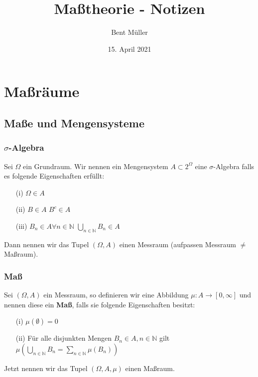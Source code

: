 \documentclass[a4paper]{article}
\newcommand{\N}{\mathbb{N}}
\theoremstyle{definition}
\begin{document}
\title{ \textbf{Maßtheorie - Notizen} }
\author{Bent Müller}
\date{15. April 2021}
\maketitle
\tableofcontents
\pagebreak

\section{Maßräume}

\subsection{Maße und Mengensysteme}

\begin{theorem} %
	\subsubsection{$\sigma$-Algebra}

	Sei $\Omega$ ein Grundraum.
	Wir nennen ein Mengensystem $A \subset 2^{\Omega}$ eine $\sigma$-Algebra 
	falls es folgende Eigenschaften erfüllt:
	\begin{itemize}
		\item[(i)] $\Omega \in A$
		\item[(ii)] $B \in A$ \Rightarrow $B^{c} \in A$
		\item[(iii)] $B_n \in A \forall n \in \N$ \; \Longrightarrow \;
			$\bigcup_{n\in \N} B_n \in A$
	\end{itemize}

	Dann nennen wir das Tupel $(\Omega, A)$ einen Messraum (aufpassen
	Messraum $\neq$ Maßraum).
\end{theorem}

\begin{theorem} %
	\subsubsection{Maß}
	Sei $(\Omega, A)$ ein Messraum, so definieren wir eine Abbildung
	$\mu : A \longrightarrow [0, \infty]$ und nennen diese ein \textbf{Maß},
	falls sie folgende Eigenschaften besitzt:
	\begin{itemize}
		\item[(i)] $\mu (\emptyset) = 0$
		\item[(ii)] Für alle disjunkten Mengen $B_n \in A, n \in \N$ gilt
			$\mu \left( 
				\bigcup_{n\in \N} B_n = \sum_{n\in \N} \mu (B_n)
			\right) $
	\end{itemize}

	Jetzt nennen wir das Tupel $(\Omega, A, \mu)$ einen Maßraum.
\end{theorem}
\end{document}
